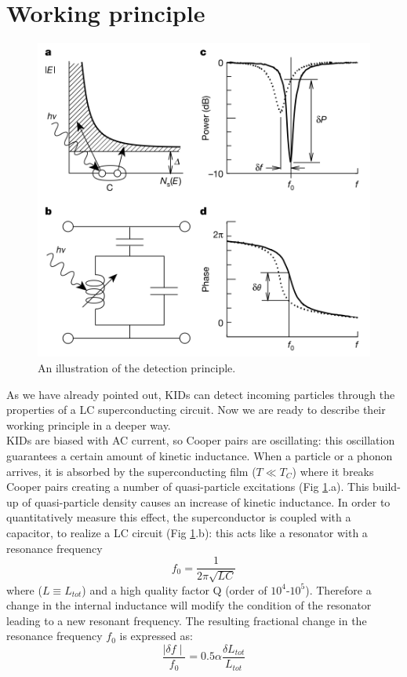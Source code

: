 \documentclass[12pt]{article}
\begin{document}
\section{Working principle}
\begin{figure}[H] 
        \centering \includegraphics[width=0.55\columnwidth]{Schermata 2021-06-08 alle 13.47.58.png}
        \caption{
                \label{fig:pric} An illustration of the detection principle.
        }
\end{figure}
As we have already pointed out, KIDs can detect incoming particles through the properties of a LC superconducting circuit. Now we are ready to describe their working principle in a deeper way.\\
KIDs are biased with AC current, so Cooper pairs are oscillating: this oscillation guarantees a certain amount of kinetic inductance.
When a particle or a phonon arrives, it is absorbed by the superconducting film ($T \ll T_C$) where it breaks Cooper pairs creating a number of quasi-particle excitations (Fig \ref{fig:pric}.a). This build-up of quasi-particle density causes an increase of kinetic inductance. In order to  quantitatively measure this effect, the superconductor is coupled with a capacitor, to realize a LC circuit (Fig \ref{fig:pric}.b): this acts like a resonator with a resonance frequency 
\begin{equation}
f_0 = \frac{1}{2 \pi \sqrt{LC}}
\end{equation}
where ($L \equiv L_{tot}$) and a high quality factor Q (order of $10^4$-$10^5$). Therefore a change in the internal inductance will modify the condition of the resonator leading to a new resonant frequency. The resulting fractional change in the resonance frequency $f_0$ is expressed as:
\begin{equation}
    \frac{\mid \delta f \mid}{f_0} = 0.5 \alpha \frac{\delta L_{tot}}{L_{tot}}
\end{equation}
\end{document}
